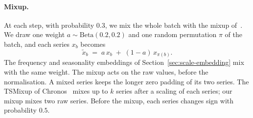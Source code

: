 \paragraph{Mixup.}
At each step, with probability $0.3$, we mix the whole batch with the
mixup of~\citet{zhang2018mixup}. We draw one weight
$a \sim \mathrm{Beta}(0.2, 0.2)$ and one random permutation $\pi$ of
the batch, and each series $x_b$ becomes
\[
  \tilde{x}_b \;=\; a\, x_b \;+\; (1 - a)\, x_{\pi(b)} .
\]
The frequency and seasonality embeddings of
Section~\ref{sec:scale-embedding} mix with the same weight. The mixup
acts on the raw values, before the normalisation. A mixed series keeps
the longer zero padding of its two series. The TSMixup of
Chronos~\citep{ansari2024chronos} mixes up to $k$ series after a
scaling of each series; our mixup mixes two raw series. Before the
mixup, each series changes sign with probability $0.5$.


